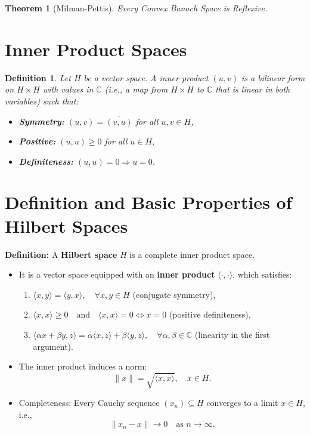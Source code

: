 \documentclass{article}
\newtheorem{definition}{Definition}[section]
\newtheorem{theorem}{Theorem}[section]
\begin{document}
\begin{theorem}[Milman-Pettis]
    Every Convex Banach Space is Reflexive.
\end{theorem}
\section{Inner Product Spaces}
\begin{definition}
    Let \( H \) be a vector space. A inner product \( (u, v) \) is a bilinear form on \( H \times H \) with values in \( \mathbb{C} \) (i.e., a map from \( H \times H \) to \( \mathbb{C} \) that is linear in both variables) such that:
\begin{itemize}
    \item \textbf{Symmetry:} \( (u, v) = \overline{(v, u)} \) for all \( u, v \in H \),
    \item \textbf{Positive:} \( (u, u) \geq 0 \) for all \( u \in H \),
    \item \textbf{Definiteness:} \( (u, u) = 0 \Rightarrow u = 0 \).
\end{itemize}
\end{definition}

\setlength{\parskip}{1em}
\setlength{\parindent}{0em}
\renewcommand{\baselinestretch}{1.2}



\section{Definition and Basic Properties of Hilbert Spaces}

\textbf{Definition:} A \textbf{Hilbert space} \( H \) is a complete inner product space. 

\begin{itemize}
    \item It is a vector space equipped with an \textbf{inner product} \( \langle \cdot, \cdot \rangle \), which satisfies:
    \begin{enumerate}
        \item \(\langle x, y \rangle = \overline{\langle y, x \rangle}, \quad \forall x, y \in H\) (conjugate symmetry),
        \item \(\langle x, x \rangle \geq 0 \quad \text{and} \quad \langle x, x \rangle = 0 \iff x = 0\) (positive definiteness),
        \item \(\langle \alpha x + \beta y, z \rangle = \alpha \langle x, z \rangle + \beta \langle y, z \rangle, \quad \forall \alpha, \beta \in \mathbb{C}\) (linearity in the first argument).
    \end{enumerate}
    \item The inner product induces a norm:
    \[
    \|x\| = \sqrt{\langle x, x \rangle}, \quad x \in H.
    \]
    \item Completeness: Every Cauchy sequence \( (x_n) \subseteq H \) converges to a limit \( x \in H \), i.e., 
    \[
    \|x_n - x\| \to 0 \quad \text{as } n \to \infty.
    \]
\end{itemize}
\end{document}

